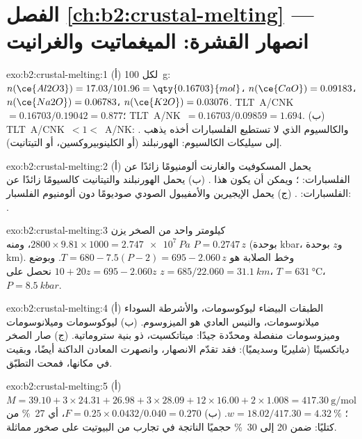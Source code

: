 \section*{الفصل \ref{ch:b2:crustal-melting} --- انصهار القشرة: الميغماتيت والغرانيت}

\begin{solution}{exo:b2:crustal-melting:1}
(أ) لكل \qty{100}{\gram}: $n(\ce{Al2O3}) = 17.03/101.96 = \qty{0.16703}{mol}$،
$n(\ce{CaO}) = 0.09183$، $n(\ce{Na2O}) = 0.06783$، $n(\ce{K2O}) = 0.03076$.
\mbox{\textdir TLT A/CNK $= 0.16703/0.19042 = 0.877$}؛ \mbox{\textdir TLT A/NK $= 0.16703/0.09859 = 1.694$}.
(ب) \mbox{\textdir TLT A/CNK $< 1 <$ A/NK}: . والكالسيوم الذي لا تستطيع الفلسبارات أخذه يذهب إلى
سيليكات الكالسيوم: الهورنبلند (أو الكلينوبيروكسين، أو التيتانيت).
\end{solution}

\begin{solution}{exo:b2:crustal-melting:2}
(أ) يحمل المسكوفيت والغارنت ألومنيومًا زائدًا عن الفلسبارات: ؛ ويمكن أن يكون هذا . (ب) يحمل الهورنبلند والتيتانيت كالسيومًا زائدًا عن الفلسبارات:
. (ج) يحمل الإيجيرين والأمفيبول الصودي صوديومًا دون ألومنيوم
الفلسبار: .
\end{solution}

\begin{solution}{exo:b2:crustal-melting:3}
كيلومتر واحد من الصخر يزن $2800\times9.81\times1000 = \qty{2.747e7}{Pa}$، ومنه
$P = 0.2747\,z$ (بوحدة \unit{kbar}، و$z$ بوحدة \unit{km}). وخط الصلابة هو $T = 680 - 7.5(P -
2) = 695 - 2.060\,z$. وبوضع $10 + 20z = 695 - 2.060z$ نحصل على $z = 685/22.060 =
\qty{31.1}{km}$، $T = \qty{631}{\celsius}$، $P = \qty{8.5}{kbar}$.
\end{solution}

\begin{solution}{exo:b2:crustal-melting:4}
(أ) الطبقات البيضاء ليوكوسومات، والأشرطة السوداء ميلانوسومات، والنيس العادي هو
الميزوسوم. (ب) ليوكوسومات وميلانوسومات وميزوسومات منفصلة ومحدّدة جيدًا: ميتاتكسيت،
ذو بنية ستروماتية. (ج) صار الصخر دياتكسيتًا (شليريًا وسديميًا):
فقد تقدّم الانصهار، وانصهرت المعادن الداكنة أيضًا، وبقيت  في مكانها،
فمحت التطبّق.
\end{solution}

\begin{solution}{exo:b2:crustal-melting:5}
(أ) $M = 39.10 + 3\times24.31 + 26.98 + 3\times28.09 + 12\times16.00 + 2\times1.008 =
\qty{417.30}{\gram\per\mole}$؛ $w = 18.02/417.30 = \qty{4.32}{\percent}$.
(ب) $F = 0.25\times0.0432/0.040 = 0.270$، أي \qty{27}{\percent} من  كتليًا: ضمن
20 إلى \qty{30}{\percent} حجميًا الناتجة في تجارب  من البيوتيت على
صخور مماثلة.
\end{solution}

